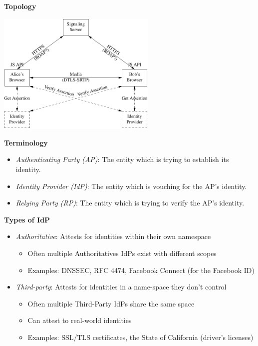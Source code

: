 \documentclass[helvetica]{seminar}
\newcommand{\heading}[1]{%
  \begin{center} 
    \large\bf 
    #1 
  \end{center} 
  \vspace{.4 in}}
\begin{document}
\begin{slide}
\heading{Topology}

\begin{center}
\includegraphics[width=3in]{full-topology}
\end{center}

\end{slide}



\begin{slide}
\heading{Terminology}
\begin{itemize}
\item[] \emph{Authenticating Party (AP)}:  The entity which is trying to establish its identity.

\item[] \emph{Identity Provider (IdP)}:  The entity which is vouching for the AP's identity.

\item[] \emph{ Relying Party (RP)}:  The entity which is trying to verify the AP's identity.
\end{itemize}

\end{slide}





\begin{slide}
\heading{Types of IdP}

\begin{itemize}
\item[] \emph{Authoritative}: Attests for identities within their own namespace
  \begin{itemize}
  \item Often multiple Authoritatives IdPs exist with different scopes
  \item Examples: DNSSEC, RFC 4474, Facebook Connect (for the Facebook ID)
  \end{itemize}

\item[] \emph{Third-party}: Attests for identities in a name-space they don't control
  \begin{itemize}
  \item Often multiple Third-Party IdPs share the same space
  \item Can attest to real-world identities
  \item Examples: SSL/TLS certificates, the State of California (driver's licenses)
  \end{itemize}
\end{itemize}
\end{slide}
\end{document}

